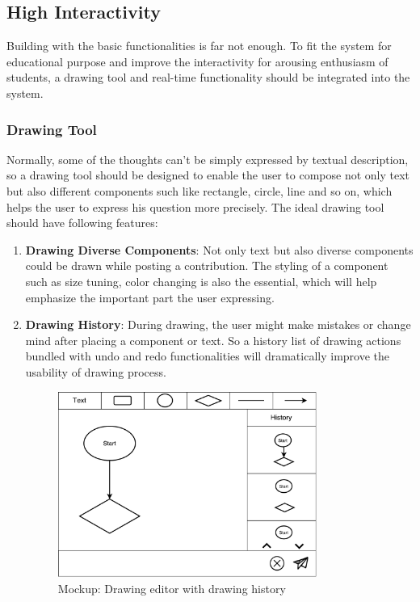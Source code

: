 \subsection{High Interactivity}
Building with the basic functionalities is far not enough. To fit the system for educational purpose and improve the interactivity for arousing enthusiasm of students, a drawing tool and real-time functionality should be integrated into the system.

\subsubsection{Drawing Tool}
Normally, some of the thoughts can't be simply expressed by textual description, so a drawing tool should be designed to enable the user to compose not only text but also different components such like rectangle, circle, line and so on, which helps the user to express his question more precisely.
The ideal drawing tool should have following features:

\begin{enumerate}
\item
\textbf{Drawing Diverse Components}: Not only text but also diverse components could be drawn while posting a contribution. The styling of a component such as size tuning, color changing is also the essential, which will help emphasize the important part the user expressing.

\item
\textbf{Drawing History}: During drawing, the user might make mistakes or change mind after placing a component or text. So a history list of drawing actions bundled with undo and redo functionalities will dramatically improve the usability of drawing process.

\begin{figure}[!htbp]
  \centering
    \includegraphics[width=0.8\textwidth]{Figures/mockup/editor.pdf}
  \caption{Mockup: Drawing editor with drawing history}
\end{figure}


\end{enumerate}


